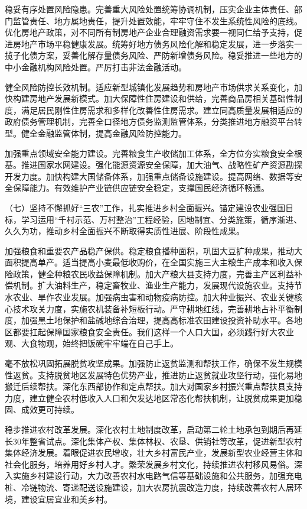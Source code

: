 \documentclass[10pt, UTF8]{ctexbook} %
\begin{document}
稳妥有序处置风险隐患。完善重大风险处置统筹协调机制，压实企业主体责任、部门监管责任、地方属地责任，提升处置效能，牢牢守住不发生系统性风险的底线。优化房地产政策，对不同所有制房地产企业合理融资需求要一视同仁给予支持，促进房地产市场平稳健康发展。统筹好地方债务风险化解和稳定发展，进一步落实一揽子化债方案，妥善化解存量债务风险、严防新增债务风险。稳妥推进一些地方的中小金融机构风险处置。严厉打击非法金融活动。

健全风险防控长效机制。适应新型城镇化发展趋势和房地产市场供求关系变化，加快构建房地产发展新模式。加大保障性住房建设和供给，完善商品房相关基础性制度，满足居民刚性住房需求和多样化改善性住房需求。建立同高质量发展相适应的政府债务管理机制，完善全口径地方债务监测监管体系，分类推进地方融资平台转型。健全金融监管体制，提高金融风险防控能力。

加强重点领域安全能力建设。完善粮食生产收储加工体系，全方位夯实粮食安全根基。推进国家水网建设。强化能源资源安全保障，加大油气、战略性矿产资源勘探开发力度。加快构建大国储备体系，加强重点储备设施建设。提高网络、数据等安全保障能力。有效维护产业链供应链安全稳定，支撑国民经济循环畅通。

（七）坚持不懈抓好“三农”工作，扎实推进乡村全面振兴。锚定建设农业强国目标，学习运用“千村示范、万村整治”工程经验，因地制宜、分类施策，循序渐进、久久为功，推动乡村全面振兴不断取得实质性进展、阶段性成果。

加强粮食和重要农产品稳产保供。稳定粮食播种面积，巩固大豆扩种成果，推动大面积提高单产。适当提高小麦最低收购价，在全国实施三大主粮生产成本和收入保险政策，健全种粮农民收益保障机制。加大产粮大县支持力度，完善主产区利益补偿机制。扩大油料生产，稳定畜牧业、渔业生产能力，发展现代设施农业。支持节水农业、旱作农业发展。加强病虫害和动物疫病防控。加大种业振兴、农业关键核心技术攻关力度，实施农机装备补短板行动。严守耕地红线，完善耕地占补平衡制度，加强黑土地保护和盐碱地综合治理，提高高标准农田建设投资补助水平。各地区都要扛起保障国家粮食安全责任。我们这样一个人口大国，必须践行好大农业观、大食物观，始终把饭碗牢牢端在自己手上。

毫不放松巩固拓展脱贫攻坚成果。加强防止返贫监测和帮扶工作，确保不发生规模性返贫。支持脱贫地区发展特色优势产业，推进防止返贫就业攻坚行动，强化易地搬迁后续帮扶。深化东西部协作和定点帮扶。加大对国家乡村振兴重点帮扶县支持力度，建立健全农村低收入人口和欠发达地区常态化帮扶机制，让脱贫成果更加稳固、成效更可持续。

稳步推进农村改革发展。深化农村土地制度改革，启动第二轮土地承包到期后再延长30年整省试点。深化集体产权、集体林权、农垦、供销社等改革，促进新型农村集体经济发展。着眼促进农民增收，壮大乡村富民产业，发展新型农业经营主体和社会化服务，培养用好乡村人才。繁荣发展乡村文化，持续推进农村移风易俗。深入实施乡村建设行动，大力改善农村水电路气信等基础设施和公共服务，加强充电桩、冷链物流、寄递配送设施建设，加大农房抗震改造力度，持续改善农村人居环境，建设宜居宜业和美乡村。
\end{document}
